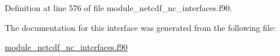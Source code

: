 Definition at line 576 of file module\+\_\+netcdf\+\_\+nc\+\_\+interfaces.\+f90.



The documentation for this interface was generated from the following file\+:\begin{DoxyCompactItemize}
\item 
\hyperlink{module__netcdf__nc__interfaces_8f90}{module\+\_\+netcdf\+\_\+nc\+\_\+interfaces.\+f90}\end{DoxyCompactItemize}

